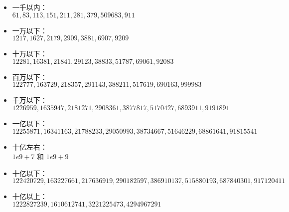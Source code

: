 \documentclass[E:/GsjzTle/main/main.tex]{subfiles}
\begin{document}
\begin{itemize}
\item
  一千以内：\\
  \(61,             83,      113,      151,      211,      281,      379,      509      683,  911 \)
\item
  一万以下：\\
  \(1217,     1627,     2179,     2909,     3881,    6907,          9209\)
\item
  十万以下：\\
  \(12281,    16381,    21841,    29123,    38833,    51787,   69061,        92083     \)
\item
  百万以下：\\
  \(122777,   163729,   218357,   291143,   388211,   517619,     690163,     999983\)
\item
  千万以下：\(1226959,  1635947,  2181271,  2908361,  3877817,  5170427, 6893911,      9191891\)
\item
  一亿以下：\(12255871, 16341163, 21788233, 29050993, 38734667, 51646229,68861641,  91815541\)
\item
  十亿左右：\\
  \(1e9+7\) 和 \(1e9+9\)
\item
  十亿以下：\(122420729,163227661,217636919,290182597,386910137,515880193,687840301,917120411\)
\item
  十亿以上：\\
  \(1222827239,1610612741, 3221225473, 4294967291         \)
\end{itemize}
\end{document}
